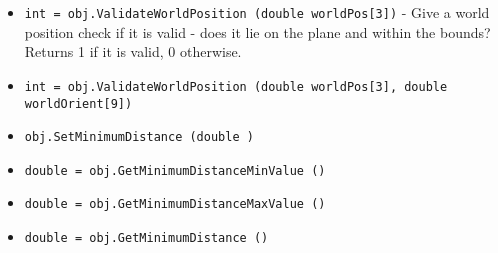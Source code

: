 \begin{itemize}
\item  \verb|int = obj.ValidateWorldPosition (double worldPos[3])| -  Give a world position check if it is valid - does
 it lie on the plane and within the bounds? Returns
 1 if it is valid, 0 otherwise.

\item  \verb|int = obj.ValidateWorldPosition (double worldPos[3], double worldOrient[9])|

\item  \verb|obj.SetMinimumDistance (double )|

\item  \verb|double = obj.GetMinimumDistanceMinValue ()|

\item  \verb|double = obj.GetMinimumDistanceMaxValue ()|

\item  \verb|double = obj.GetMinimumDistance ()|

\end{itemize}

